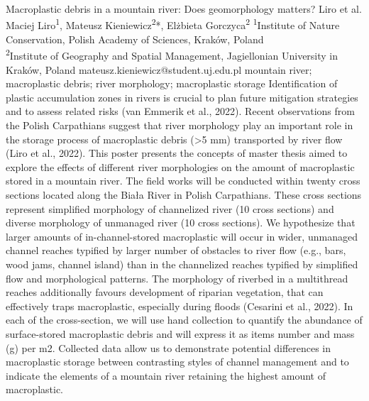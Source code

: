 \abstract
{Macroplastic debris in a mountain river: Does geomorphology matters?} 
{Liro et al.} 
{Maciej Liro\textsuperscript{1}, Mateusz Kieniewicz\textsuperscript{2}*, Elżbieta Gorczyca\textsuperscript{2}} 
{\POtag} 
{
\textsuperscript{1}Institute of Nature Conservation, Polish Academy of Sciences, Kraków, Poland\\
\textsuperscript{2}Institute of Geography and Spatial Management, Jagiellonian University in Kraków, Poland
}
{mateusz.kieniewicz@student.uj.edu.pl}  %
{mountain river; macroplastic debris; river morphology; macroplastic storage }
{Identification of plastic accumulation zones in rivers is crucial to plan future mitigation strategies and to assess related risks (van Emmerik et al., 2022). Recent observations from the Polish Carpathians suggest that river morphology play an important role in the storage process of macroplastic debris (>5 mm) transported by river flow (Liro et al., 2022). This poster presents the concepts of master thesis aimed to explore the effects of different river morphologies on the amount of macroplastic stored in a mountain river. The field works will be conducted within twenty cross sections located along the Biała River in Polish Carpathians. These cross sections represent simplified morphology of channelized river (10 cross sections) and diverse morphology of unmanaged river (10 cross sections). We hypothesize that larger amounts of in-channel-stored macroplastic will occur in wider, unmanaged channel reaches typified by larger number of obstacles to river flow (e.g., bars, wood jams, channel island) than in the channelized reaches typified by simplified flow and morphological patterns. The morphology of riverbed in a multithread reaches additionally favours development of riparian vegetation, that can effectively traps macroplastic, especially during floods (Cesarini et al., 2022). In each of the cross-section, we will use hand collection to quantify the abundance of surface-stored macroplastic debris and will express it as items number and mass (g) per m2. Collected data allow us to demonstrate potential differences in macroplastic storage between contrasting styles of channel management and to indicate the elements of a mountain river retaining the highest amount of macroplastic.
}
